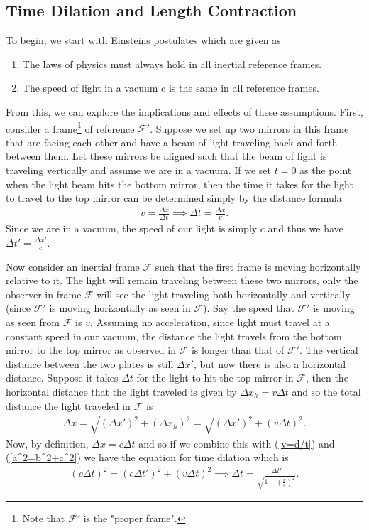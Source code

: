 \subsection{Time Dilation and Length Contraction}
To begin, we start with Einsteins postulates which are given as
\begin{enumerate}
	\item The laws of physics must always hold in all inertial reference frames.
	\item The speed of light in a vacuum c is the same in all reference frames.
\end{enumerate}
From this, we can explore the implications and effects of these assumptions. First, consider a frame\footnote{Note that $\mathcal{F}'$ is the "proper frame".} of reference $\mathcal{F}'$. Suppose we set up two mirrors in this frame that are facing each other and have a beam of light traveling back and forth between them. Let these mirrors be aligned such that the beam of light is traveling vertically and assume we are in a vacuum. If we set $t=0$ as the point when the light beam hits the bottom mirror, then the time it takes for the light to travel to the top mirror can be determined simply by the distance formula \begin{align}
	v=\frac{\Delta x}{\Delta t} \implies \Delta t = \frac{\Delta x}{v}. \label{v=d/t}
\end{align} 
Since we are in a vacuum, the speed of our light is simply $c$ and thus we have $\Delta t' = \frac{\Delta x'}{c}$. 

Now consider an inertial frame $\mathcal{F}$ such that the first frame is moving horizontally relative to it. The light will remain traveling between these two mirrors, only the observer in frame $\mathcal{F}$ will see the light traveling both horizontally and vertically (since $\mathcal{F}'$ is moving horizontally as seen in $\mathcal{F}$). Say the speed that $\mathcal{F}'$ is moving as seen from $\mathcal{F}$ is $v$. Assuming no acceleration, since light must travel at a constant speed in our vacuum, the distance the light travels from the bottom mirror to the top mirror as observed in $\mathcal{F}$ is longer than that of $\mathcal{F}'$. The vertical distance between the two plates is still $\Delta x'$, but now there is also a horizontal distance. Suppose it takes $\Delta t$ for the light to hit the top mirror in $\mathcal{F}$, then the horizontal distance that the light traveled is given by $\Delta x_h = v \Delta t$ and so the total distance the light traveled in $\mathcal{F}$ is 
\begin{align}
	\Delta x =\sqrt{(\Delta x')^2 + (\Delta x_h)^2}=\sqrt{(\Delta x')^2 + (v \Delta t)^2}. \label{a^2=b^2+c^2}
\end{align}
Now, by definition, $\Delta x = c \Delta t$ and so if we combine this with (\ref{v=d/t}) and (\ref{a^2=b^2+c^2}) we have the equation for time dilation which is
\begin{align}
	(c \Delta t)^2=(c \Delta t')^2 + (v \Delta t)^2 \implies \boxed{\Delta t=\frac{\Delta t'}{\sqrt{1-\left(\frac{v}{c}\right)^2}}} \label{time dilation}.
\end{align}

